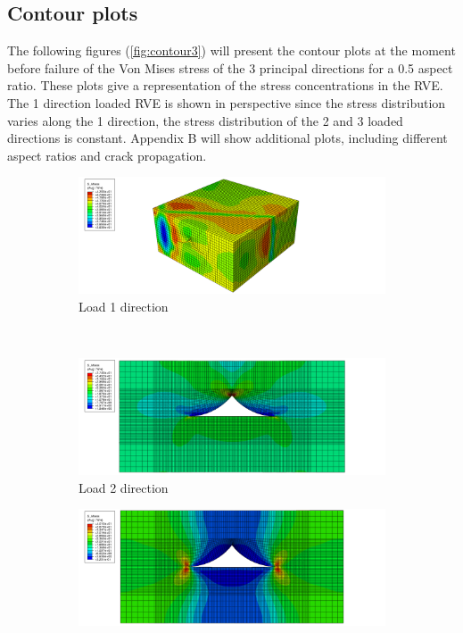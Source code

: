 \subsection{Contour plots }
The following figures (\ref{fig:contour3}) will present the contour plots at the moment before failure of the Von Mises stress of the 3 principal directions for a 0.5 aspect ratio. These plots give a representation of the stress concentrations in the RVE. The 1 direction loaded RVE is shown in perspective since the stress distribution varies along the 1 direction, the stress distribution of the 2 and 3 loaded directions is constant. Appendix B will show additional plots, including different aspect ratios and crack propagation. 

\begin{figure}[H]
\centering
  \begin{subfigure}[b]{0.8\textwidth}
    \includegraphics[width=\textwidth]{chapter_7_non-elasticmodelling/figures/p1_05.png}
    \caption{Load 1 direction}
  \end{subfigure}
  \\
    \begin{subfigure}[b]{0.8\textwidth}
    \includegraphics[width=\textwidth]{chapter_7_non-elasticmodelling/figures/p2_05.png}
    \caption{Load 2 direction}
  \end{subfigure}
    \begin{subfigure}[b]{0.8\textwidth}
    \includegraphics[width=\textwidth]{chapter_7_non-elasticmodelling/figures/p3_05.png}

\end{subfigure}
\end{figure}
